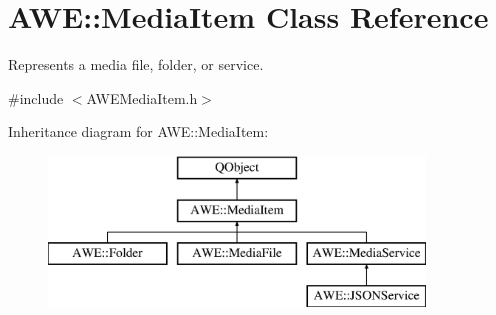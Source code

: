 \hypertarget{class_a_w_e_1_1_media_item}{\section{A\-W\-E\-:\-:Media\-Item Class Reference}
\label{class_a_w_e_1_1_media_item}
}


Represents a media file, folder, or service.  




{\ttfamily \#include $<$A\-W\-E\-Media\-Item.\-h$>$}

Inheritance diagram for A\-W\-E\-:\-:Media\-Item\-:\begin{figure}[H]
\begin{center}
\leavevmode
\includegraphics[height=4.000000cm]{class_a_w_e_1_1_media_item}
\end{center}
\end{figure}
